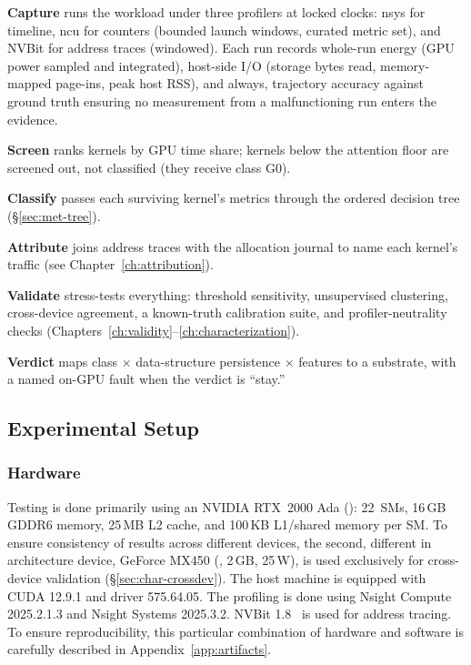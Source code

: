 \textbf{Capture} runs the workload under three profilers at locked clocks: nsys for timeline, ncu for counters (bounded launch windows, curated metric set), and NVBit for address traces (windowed). Each run records whole-run energy (GPU power sampled and integrated), host-side I/O (storage bytes read, memory-mapped page-ins, peak host RSS), and always, trajectory accuracy against ground truth ensuring no measurement from a malfunctioning run enters the evidence.

\textbf{Screen} ranks kernels by GPU time share; kernels below the attention floor are screened out, not classified (they receive class G0).

\textbf{Classify} passes each surviving kernel’s metrics through the ordered decision tree (\S\ref{sec:met-tree}).

\textbf{Attribute} joins address traces with the allocation journal to name each kernel’s traffic (see Chapter~\ref{ch:attribution}).

\textbf{Validate} stress-tests everything: threshold sensitivity, unsupervised clustering, cross-device agreement, a known-truth calibration suite, and profiler-neutrality checks (Chapters~\ref{ch:validity}--\ref{ch:characterization}).

\textbf{Verdict} maps class $\times$ data-structure persistence $\times$ features to a substrate, with a named on-GPU fault when the verdict is ``stay.''

\subsection{Experimental Setup}
\label{sec:met-setup}

\subsubsection{Hardware}

Testing is done primarily using an NVIDIA RTX~2000 Ada (): 22~SMs, 16\,GB GDDR6 memory, 25\,MB L2 cache, and 100\,KB L1/shared memory per SM. To ensure consistency of results across different devices, the second, different in architecture device, GeForce MX450 (, 2\,GB, 25\,W), is used exclusively for cross-device validation (\S\ref{sec:char-crossdev}). The host machine is equipped with CUDA 12.9.1 and driver 575.64.05. The profiling is done using Nsight Compute 2025.2.1.3 and Nsight Systems 2025.3.2. NVBit 1.8~\cite{villa2019nvbit} is used for address tracing. To ensure reproducibility, this particular combination of hardware and software is carefully described in Appendix~\ref{app:artifacts}.

